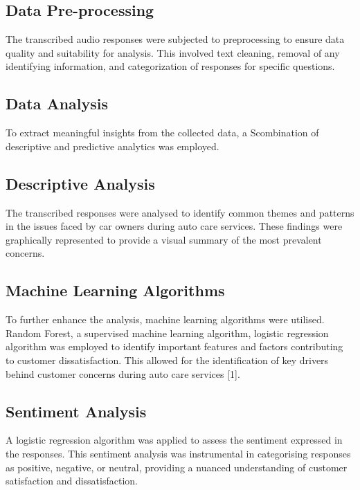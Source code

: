 \documentclass[conference]{IEEEtran}
\begin{document}
\subsection{Data Pre-processing}
The transcribed audio responses were subjected to preprocessing to ensure data quality and suitability for analysis.  This involved text cleaning, removal of any identifying information, and categorization of responses for specific questions. 
\subsection{Data Analysis}
To extract meaningful insights from the collected data, a Scombination of descriptive and predictive analytics was employed.
\subsection{Descriptive Analysis}
The transcribed responses were analysed to identify common themes and patterns in the issues faced by car owners during auto care services.  These findings were graphically represented to provide a visual summary of the most prevalent concerns. 
\subsection{Machine Learning Algorithms}
To further enhance the analysis, machine learning algorithms were utilised.  Random Forest, a supervised machine learning algorithm, logistic regression algorithm was employed to identify important features and factors contributing to customer dissatisfaction.  This allowed for the identification of key drivers behind customer concerns during auto care services [1]. 
\subsection{Sentiment Analysis}
A logistic regression algorithm was applied to assess the sentiment expressed in the responses. This sentiment analysis was instrumental in categorising responses as positive, negative, or neutral, providing a nuanced understanding of customer satisfaction and dissatisfaction. 
\end{document}
